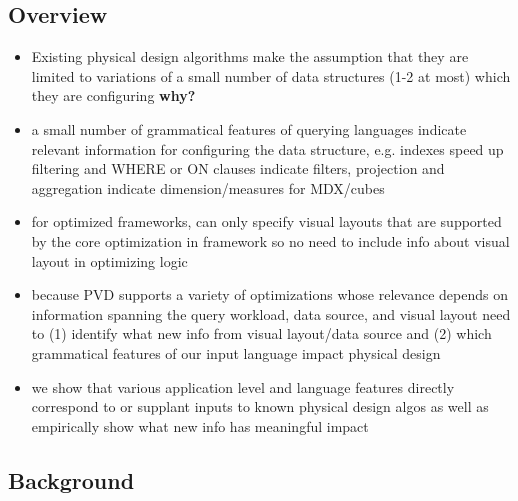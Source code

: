 \subsection{Overview}
\begin{itemize}
\item Existing physical design algorithms make the assumption that they are limited to variations of a small number of data structures (1-2 at most) which they are configuring \textbf{why?}
\item a small number of grammatical features of querying languages indicate relevant information for configuring the data structure, e.g. indexes speed up filtering and WHERE or ON clauses indicate filters, projection and aggregation indicate dimension/measures for MDX/cubes
\item for optimized frameworks, can only specify visual layouts that are supported by the core optimization in framework so no need to include info about visual layout in optimizing logic
\item because PVD supports a variety of optimizations whose relevance depends on information spanning the query workload, data source, and visual layout need to (1) identify what new info from visual layout/data source and (2) which grammatical features of our input language impact physical design
\item we show that various application level and language features directly correspond to or supplant inputs to known physical design algos as well as empirically show what new info has meaningful impact
\end{itemize}

\subsection{Background} %

